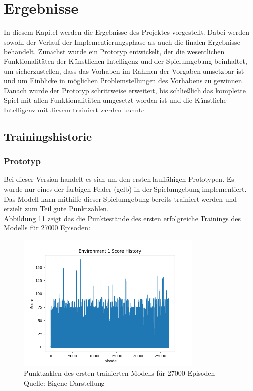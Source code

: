 \section{Ergebnisse}
In diesem Kapitel werden die Ergebnisse des Projektes vorgestellt. Dabei werden sowohl der Verlauf der Implementierungsphase als auch die finalen Ergebnisse behandelt. Zunächst wurde ein Prototyp entwickelt, der die wesentlichen Funktionalitäten der Künstlichen Intelligenz und der Spielumgebung beinhaltet, um sicherzustellen, dass das Vorhaben im Rahmen der Vorgaben umsetzbar ist und um Einblicke in möglichen Problemstellungen des Vorhabens zu gewinnen. Danach wurde der Prototyp schrittweise erweitert, bis schließlich das komplette Spiel mit allen Funktionalitäten umgesetzt worden ist und die Künstliche Intelligenz mit diesem trainiert werden konnte.
\subsection{Trainingshistorie}
\subsubsection{Prototyp}
Bei dieser Version handelt es sich um den ersten lauffähigen Prototypen. Es wurde nur eines der farbigen Felder (gelb) in der Spielumgebung implementiert. Das Modell kann mithilfe dieser Spielumgebung bereits trainiert werden und erzielt zum Teil gute Punktzahlen.\\

Abbildung 11 zeigt das die Punktestände des ersten erfolgreiche Trainings des Modells für 27000 Episoden:
\nopagebreak
\begin{figure}[H]
	\centering
	\includegraphics[width=0.8\textwidth]{Bilder/firstpropertraining} 
	\caption[Punktzahlen des ersten trainierten Modells für 27000 Episoden]{Punktzahlen des ersten trainierten Modells für 27000 Episoden\\ Quelle: Eigene Darstellung}
\end{figure}

